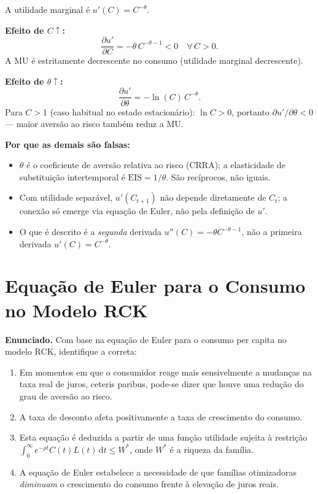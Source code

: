 \documentclass[12pt, a4paper]{article}
\newcommand{\dif}{\mathrm{d}}
\begin{document}
\begin{correctbox}[title={Resposta correta: c)}]
A utilidade marginal é $u'(C) = C^{-\theta}$.

\textbf{Efeito de $C\uparrow$:}
\[
\frac{\partial u'}{\partial C} = -\theta\, C^{-\theta-1} < 0 \quad \forall\, C > 0.
\]
A MU é estritamente decrescente no consumo (utilidade marginal decrescente). \checkmark

\textbf{Efeito de $\theta\uparrow$:}
\[
\frac{\partial u'}{\partial\theta} = -\ln(C)\,C^{-\theta}.
\]
Para $C > 1$ (caso habitual no estado estacionário): $\ln C > 0$, portanto $\partial u'/\partial\theta < 0$ ---
maior aversão ao risco também reduz a MU. \checkmark

\textbf{Por que as demais são falsas:}
\begin{itemize}[leftmargin=*]
\item[a)] $\theta$ é o coeficiente de aversão relativa ao risco (CRRA); a elasticidade de
substituição intertemporal é $\mathrm{EIS} = 1/\theta$. São recíprocos, não iguais.
\item[b)] Com utilidade separável, $u'(C_{t+1})$ não depende diretamente de $C_t$; a conexão
só emerge via equação de Euler, não pela definição de $u'$.
\item[d)] O que é descrito é a \emph{segunda} derivada $u''(C) = -\theta C^{-\theta-1}$, não a primeira
derivada $u'(C) = C^{-\theta}$.
\end{itemize}
\end{correctbox}

\section{Equação de Euler para o Consumo no Modelo RCK}

\textbf{Enunciado.} Com base na equação de Euler para o consumo per capita no modelo RCK, identifique a correta:

\begin{enumerate}[label=\alph*)]
\item Em momentos em que o consumidor reage mais sensivelmente a mudanças na taxa real de juros, ceteris paribus, pode-se dizer que houve uma redução do grau de aversão ao risco.
\item A taxa de desconto afeta positivamente a taxa de crescimento do consumo.
\item Esta equação é deduzida a partir de uma função utilidade sujeita à restrição
$\int_0^\infty e^{-\rho t}C(t)L(t)\,\dif t \leq W^*$, onde $W^*$ é a riqueza da família.
\item A equação de Euler estabelece a necessidade de que famílias otimizadoras \emph{diminuam} o crescimento do consumo frente à elevação de juros reais.
\end{enumerate}
\end{document}
